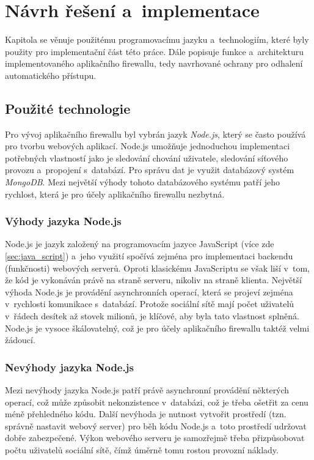 \chapter{Návrh řešení a~implementace}
\label{chap:proposal_of_solution}
Kapitola se věnuje použitému programovacímu jazyku a~technologiím, které byly použity pro implementační část této práce. Dále popisuje funkce a~architekturu implementovaného aplikačního firewallu, tedy navrhované ochrany pro odhalení automatického přístupu.

\section{Použité technologie}
Pro vývoj aplikačního firewallu byl vybrán jazyk \textit{Node.js}, který se často používá pro tvorbu webových aplikací. Node.js umožňuje jednoduchou implementaci potřebných vlastností jako je sledování chování uživatele, sledování síťového provozu a~propojení s~databází. Pro správu dat je využit databázový systém \textit{MongoDB}. Mezi největší výhody tohoto databázového systému patří jeho rychlost, která je pro účely aplikačního firewallu nezbytná.

\subsection*{Výhody jazyka Node.js}
Node.js je jazyk založený na programovacím jazyce JavaScript (více zde \ref{sec:java_script}) a~jeho využití spočívá zejména pro implementaci backendu (funkčnosti) webových serverů. Oproti klasickému JavaScriptu se však liší v~tom, že kód je vykonáván právě na straně serveru, nikoliv na straně klienta. Největší výhoda Node.js je provádění asynchronních operací, která se projeví zejména v~rychlosti komunikace s~databází. Protože sociální sítě mají počet uživatelů v~řádech desítek až stovek milionů, je klíčové, aby byla tato vlastnost splněná. Node.js je vysoce škálovatelný, což je pro účely aplikačního firewallu taktéž velmi žádoucí.

\subsection*{Nevýhody jazyka Node.js}
Mezi nevýhody jazyka Node.js patří právě asynchronní provádění některých operací, což může způsobit nekonzistence v~databázi, což je třeba ošetřit za cenu méně přehledného kódu. Další nevýhoda je nutnost vytvořit prostředí (tzn. správně nastavit webový server) pro běh kódu Node.js a~toto prostředí udržovat dobře zabezpečené. Výkon webového serveru je samozřejmě třeba přizpůsobovat počtu uživatelů sociální sítě, čímž úměrně tomu rostou provozní náklady.

